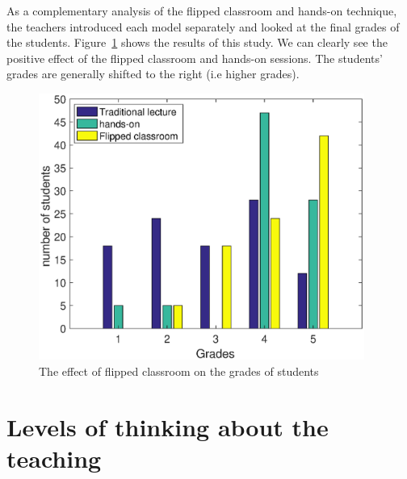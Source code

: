 \documentclass{article}
\begin{document}
As a complementary analysis of the flipped classroom and hands-on
technique, the teachers introduced each model separately and looked at
the final grades of the students. Figure~\ref{fig:grades} shows the
results of this study. We can clearly see the positive effect of the
flipped classroom and hands-on sessions. The students' grades are
generally shifted to the right (i.e higher grades).

\begin{figure}[htbp]
	\centering
	\includegraphics[width=0.95\textwidth]{fliped_effect.eps}
	\caption{The effect of flipped classroom on the grades of students}
	\label{fig:grades}
\end{figure}








\section{Levels of thinking about the teaching}
\end{document}
